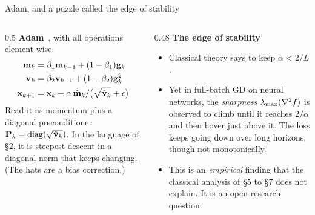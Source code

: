 \begin{frame}{Adam, and a puzzle called the edge of stability}
  \begin{columns}[T]
    \begin{column}{0.5\textwidth}
      \textbf{Adam}~\cite{kingma2015}, with all operations element-wise:
      \small
      \begin{align*}
        \mathbf m_k &= \beta_1\mathbf m_{k-1}+(1-\beta_1)\mathbf{g}_k \\
        \mathbf{v}_k &= \beta_2\mathbf{v}_{k-1}+(1-\beta_2)\mathbf{g}_k^{2}\\
        \mathbf{x}_{k+1} &= \mathbf{x}_k-\alpha\,\hat{\mathbf m}_k/\bigl(\sqrt{\hat{\mathbf{v}}_k}+\epsilon\bigr)
      \end{align*}
      \small Read it as \alert{momentum} plus a \alert{diagonal preconditioner} $\mathbf{P}_k = \operatorname{diag}(\sqrt{\hat{\mathbf{v}}_k})$. In the language
      of \S2, it is steepest descent in a diagonal norm that keeps changing. (The hats are a bias correction.)
    \end{column}
    \begin{column}{0.48\textwidth}
      \textbf{The edge of stability}~\cite{cohen2021}
      \begin{itemize}\small
        \item Classical theory says to keep $\alpha<2/L$.
        \item Yet in full-batch GD on neural networks, the \emph{sharpness} $\lambda_{\max}(\nabla^2 f)$ is observed to climb until it
              reaches $2/\alpha$ and then hover just above it. The loss keeps going down over long horizons,
              though not monotonically.
        \item This is an \emph{empirical} finding that the classical analysis of \S5 to \S7 does not explain.
              It is an open research question.
      \end{itemize}
    \end{column}
  \end{columns}
\end{frame}
